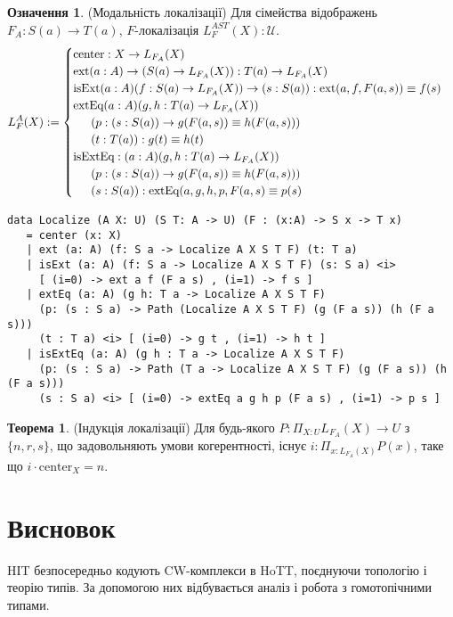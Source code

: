 \documentclass{article}
\theoremstyle{definition}
\newtheorem{theorem}{Теорема}
\newtheorem{definition}{Означення}
\begin{document}
\begin{definition} (Модальність локалізації)
Для сімейства відображень \( F_A : S(a) \to T(a) \),
\( F \)-локалізація \( L^{AST}_F(X) : \mathcal{U} \).
\[
L^{A}_F(X) :=
\begin{cases}
\text{center} : X \to L_{F_A}(X) \\
\text{ext} (a : A) \to (S(a) \to L_{F_A}(X)) : T(a) \to L_{F_A}(X) \\
\text{isExt} (a : A) (f : S(a) \to L_{F_A}(X)) \to (s : S(a)) : \text{ext}(a,f,F(a,s)) \equiv f(s) \\
\text{extEq} (a : A) (g, h : T(a) \to L_{F_A}(X)) \\
\indent (p : (s : S(a)) \to g(F(a,s)) \equiv h(F(a,s))) \\
\indent (t : T(a)) : g(t) \equiv h(t) \\
\text{isExtEq} : (a : A) (g, h : T(a) \to L_{F_A}(X)) \\
\indent  (p : (s : S(a)) \to g(F(a,s)) \equiv h(F(a,s))) \\
\indent (s : S(a)) : \text{extEq}(a,g,h,p,F(a,s) \equiv p(s)
\end{cases}
\]
\begin{lstlisting}
data Localize (A X: U) (S T: A -> U) (F : (x:A) -> S x -> T x)
   = center (x: X)
   | ext (a: A) (f: S a -> Localize A X S T F) (t: T a)
   | isExt (a: A) (f: S a -> Localize A X S T F) (s: S a) <i>
     [ (i=0) -> ext a f (F a s) , (i=1) -> f s ]
   | extEq (a: A) (g h: T a -> Localize A X S T F)
     (p: (s : S a) -> Path (Localize A X S T F) (g (F a s)) (h (F a s)))
     (t : T a) <i> [ (i=0) -> g t , (i=1) -> h t ]
   | isExtEq (a: A) (g h : T a -> Localize A X S T F)
     (p: (s : S a) -> Path (T a -> Localize A X S T F) (g (F a s)) (h (F a s)))
     (s : S a) <i> [ (i=0) -> extEq a g h p (F a s) , (i=1) -> p s ]
\end{lstlisting}
\end{definition}

\begin{theorem} (Індукція локалізації)
Для будь-якого \( P : \Pi_{X:U} L_{F_A}(X) \to U \) з \( \{n, r, s\} \), що задовольняють умови когерентності,
існує \( i : \Pi_{x:L_{F_A}(X)} P(x) \), таке що \( i \cdot \text{center}_X = n \).
\end{theorem}

\section{Висновок}
HIT безпосередньо кодують CW-комплекси в HoTT, поєднуючи топологію і теорію типів.
За допомогою них відбувається аналіз і робота з гомотопічними типами.
\end{document}
